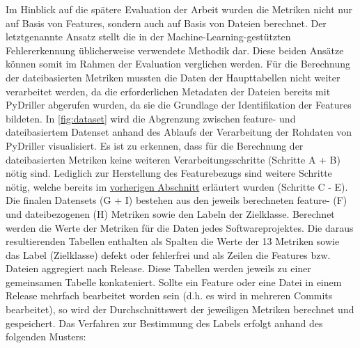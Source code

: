 Im Hinblick auf die spätere Evaluation der Arbeit wurden die Metriken nicht nur auf Basis von Features, sondern auch auf Basis von Dateien berechnet. Der letztgenannte Ansatz stellt die in der Machine-Learning-gestützten Fehlererkennung üblicherweise verwendete Methodik dar. Diese beiden Ansätze können somit im Rahmen der Evaluation verglichen werden. Für die Berechnung der dateibasierten Metriken mussten die Daten der Haupttabellen nicht weiter verarbeitet werden, da die erforderlichen Metadaten der Dateien bereits mit PyDriller abgerufen wurden, da sie die Grundlage der Identifikation der Features bildeten. In \autoref{fig:dataset} wird die Abgrenzung zwischen feature- und dateibasiertem Datenset anhand des Ablaufs der Verarbeitung der Rohdaten von PyDriller visualisiert. Es ist zu erkennen, dass für die Berechnung der dateibasierten Metriken keine weiteren Verarbeitungsschritte (Schritte A + B) nötig sind. Lediglich zur Herstellung des Featurebezugs sind weitere Schritte nötig, welche bereits im \hyperref[construction]{vorherigen Abschnitt} erläutert wurden (Schritte C - E). Die finalen Datensets (G + I) bestehen aus den jeweils berechneten feature- (F) und dateibezogenen (H) Metriken sowie den Labeln der Zielklasse. Berechnet werden die Werte der Metriken für die Daten jedes Softwareprojektes. Die daraus resultierenden Tabellen enthalten als Spalten die Werte der 13 Metriken sowie das Label (Zielklasse) \glqq defekt\grqq{} oder \glqq fehlerfrei\grqq{} und als Zeilen die Features bzw. Dateien aggregiert nach Release. Diese Tabellen werden jeweils zu einer gemeinsamen Tabelle konkateniert. Sollte ein Feature oder eine Datei in einem Release mehrfach bearbeitet worden sein (d.h. es wird in mehreren Commits bearbeitet), so wird der Durchschnittswert der jeweiligen Metriken berechnet und gespeichert. Das Verfahren zur Bestimmung des Labels erfolgt anhand des folgenden Musters:

\begin{table}[H]
\centering
{}
\end{table}

